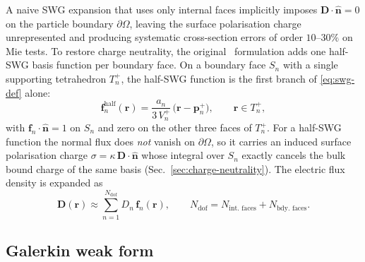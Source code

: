 \documentclass[11pt,a4paper]{article}
\begin{document}
A naive SWG expansion that uses only internal faces implicitly imposes
$\bm{D}\!\cdot\!\hat{\bm{n}} = 0$ on the particle boundary
$\partial\Omega$, leaving the surface polarisation charge unrepresented
and producing systematic cross-section errors of order
$10$--$30\%$ on Mie tests. To restore charge neutrality, the
original~\cite{SWG1984} formulation adds one half-SWG basis function per
boundary face. On a boundary face $S_n$ with a single supporting
tetrahedron $T_n^{+}$, the half-SWG function is the first branch of
\eqref{eq:swg-def} alone:
\begin{equation}
  \bm{f}_n^{\text{half}}(\bm{r})
    = \frac{a_n}{3\,V_n^{+}}\,\bigl(\bm{r} - \bm{p}_n^{+}\bigr),
  \qquad \bm{r} \in T_n^{+},
  \label{eq:half-swg}
\end{equation}
with $\bm{f}_n\!\cdot\!\hat{\bm{n}} = 1$ on $S_n$ and zero on the other
three faces of $T_n^{+}$. For a half-SWG function the normal flux does
\emph{not} vanish on $\partial\Omega$, so it carries an induced surface
polarisation charge $\sigma = \kappa\,\bm{D}\!\cdot\!\hat{\bm{n}}$ whose
integral over $S_n$ exactly cancels the bulk bound charge of the same
basis (Sec.~\ref{sec:charge-neutrality}). The electric flux density is
expanded as
\begin{equation}
  \bm{D}(\bm{r})
    \approx \sum_{n=1}^{N_{\text{dof}}} D_n\,\bm{f}_n(\bm{r}),
  \qquad
  N_{\text{dof}} = N_{\text{int. faces}} + N_{\text{bdy. faces}}.
  \label{eq:D-expansion}
\end{equation}

\subsection{Galerkin weak form}
\label{sec:galerkin}
\end{document}

